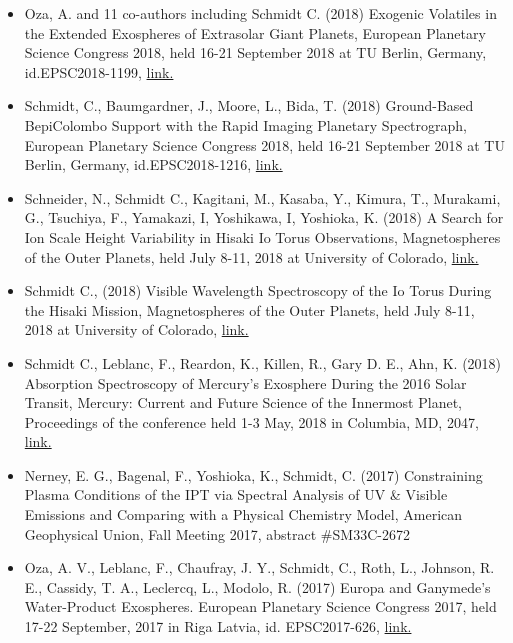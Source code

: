 \documentclass[12pt]{report}
\begin{document}
\begin{itemize}
   \item Oza, A. and 11 co-authors including Schmidt C. (2018) Exogenic Volatiles in the Extended Exospheres of Extrasolar Giant Planets, European Planetary Science Congress 2018, held 16-21 September 2018 at TU Berlin, Germany, id.EPSC2018-1199, \href{https://meetingorganizer.copernicus.org/EPSC2018/EPSC2018-1199-2.pdf}{link.} 
   \item Schmidt, C., Baumgardner, J., Moore, L., Bida, T. (2018) Ground-Based BepiColombo Support with the Rapid Imaging Planetary Spectrograph, European Planetary Science Congress 2018, held 16-21 September 2018 at TU Berlin, Germany, id.EPSC2018-1216, \href{https://meetingorganizer.copernicus.org/EPSC2018/EPSC2018-1216-2.pdf}{link.} 
   \item Schneider, N., Schmidt C., Kagitani, M., Kasaba, Y., Kimura, T., Murakami, G., Tsuchiya, F., Yamakazi, I, Yoshikawa, I, Yoshioka, K. (2018) A Search for Ion Scale Height Variability in Hisaki Io Torus Observations, Magnetospheres of the Outer Planets, held July 8-11, 2018 at University of Colorado, \href{https://lasp.colorado.edu/home/mop/files/2018/07/Mop2018-Program-Online-PDF-A-Version-No-Covers.pdf/}{link.} 
   \item Schmidt C., (2018) Visible Wavelength Spectroscopy of the Io Torus During the Hisaki Mission, Magnetospheres of the Outer Planets, held July 8-11, 2018 at University of Colorado, \href{https://lasp.colorado.edu/home/mop/files/2018/07/Mop2018-Program-Online-PDF-A-Version-No-Covers.pdf/}{link.} 
   \item Schmidt C., Leblanc, F., Reardon, K., Killen, R., Gary D. E., Ahn, K. (2018) Absorption Spectroscopy of Mercury's Exosphere During the 2016 Solar Transit, Mercury: Current and Future Science of the Innermost Planet, Proceedings of the conference held 1-3 May, 2018 in Columbia, MD, 2047, \href{https://www.hou.usra.edu/meetings/mercury2018/pdf/6022.pdf}{link.} 
   \item Nerney, E. G., Bagenal, F., Yoshioka, K., Schmidt, C. (2017) Constraining Plasma Conditions of the IPT via Spectral Analysis of UV \& Visible Emissions and Comparing with a Physical Chemistry Model, American Geophysical Union, Fall Meeting 2017, abstract \#SM33C-2672
   \item Oza, A. V., Leblanc, F., Chaufray, J. Y., Schmidt, C., Roth, L., Johnson, R. E., Cassidy, T. A., Leclercq, L., Modolo, R. (2017) Europa and Ganymede's Water-Product Exospheres. European Planetary Science Congress 2017, held 17-22 September, 2017 in Riga Latvia, id. EPSC2017-626, \href{https://meetingorganizer.copernicus.org/EPSC2017/EPSC2017-626-1.pdf}{link.} 

\end{itemize}
\end{document}
